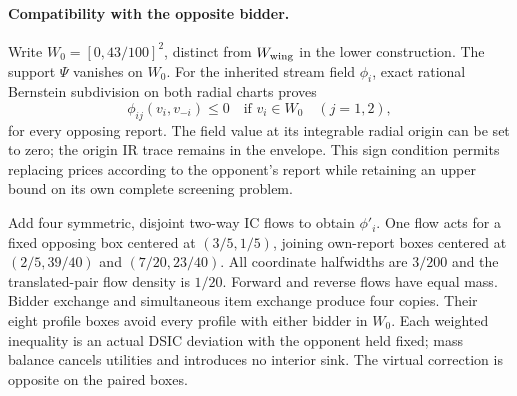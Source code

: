 \paragraph{Compatibility with the opposite bidder.}
Write $W_0=[0,43/100]^2$, distinct from $W_{\rm wing}$ in the lower
construction. The support $\Psi$ vanishes on $W_0$. For the inherited
stream field $\phi_i$, exact rational Bernstein subdivision on both
radial charts proves
\[
 \phi_{ij}(v_i,v_{-i})\le0\quad\text{if }v_i\in W_0
 \quad(j=1,2),
\]
for every opposing report. The field value at its integrable radial
origin can be set to zero; the origin IR trace remains in the envelope.
This sign condition permits replacing prices according to the opponent's
report while retaining an upper bound on its own complete screening problem.

Add four symmetric, disjoint two-way IC flows to obtain $\phi'_i$.
One flow acts for a fixed opposing box centered at $(3/5,1/5)$, joining
own-report boxes centered at $(2/5,39/40)$ and $(7/20,23/40)$.
All coordinate halfwidths are $3/200$ and the translated-pair flow density
is $1/20$. Forward and reverse flows have equal mass. Bidder exchange
and simultaneous item exchange produce four copies. Their eight profile
boxes avoid every profile with either bidder in $W_0$.
Each weighted inequality is an actual DSIC deviation with the opponent
held fixed; mass balance cancels utilities and introduces no interior sink.
The virtual correction is opposite on the paired boxes.

